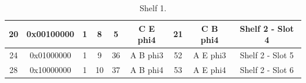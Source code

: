 \documentclass[11pt,letterpaper]{article}
\begin{document}
\begin{table}[h]
\begin{tabular}{|c|c|c|c|c|c|c|c|c|}
20                     & 0x00100000            & 1                          & 8                         & 5                             & C E phi4                      & 21                            & C B phi4                      & Shelf 2 - Slot 4                                  \\ \hline
24                     & 0x01000000            & 1                          & 9                         & 36                            & A B phi3                      & 52                            & A E phi3                      & Shelf 2 - Slot 5                                  \\ \hline
28                     & 0x10000000            & 1                          & 10                        & 37                            & A B phi4                      & 53                            & A E phi4                      & Shelf 2 - Slot 6                                  \\ \hline
\end{tabular}
\caption{Shelf 1.}
\label{tab:shelf1}
\end{table}
\end{document}
